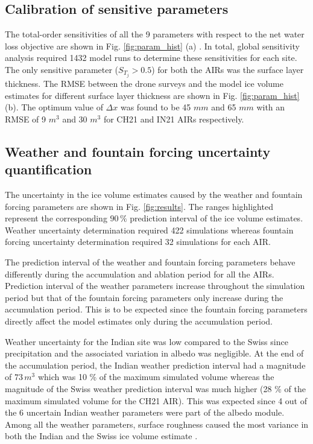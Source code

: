 \documentclass[utf8]{frontiersSCNS}
\begin{document}
\subsection{Calibration of sensitive parameters}

The total-order sensitivities of all the 9 parameters with respect to the net water loss objective are shown in
Fig. \ref{fig:param_hist} (a) . In total, global sensitivity analysis required 1432 model runs to determine these
sensitivities for each site. The only sensitive parameter ($S_{T_{j}} > 0.5$) for both the AIRs was the surface
layer thickness. The RMSE between the drone surveys and the model ice volume estimates for different surface
layer thickness are shown in Fig. \ref{fig:param_hist} (b). The optimum value of $\Delta x$ was found to be 45
$mm$ and 65 $mm$ with an RMSE of 9 $m^3$ and 30 $m^3$ for CH21 and IN21 AIRs respectively.


\subsection{Weather and fountain forcing uncertainty quantification}

The uncertainty in the ice volume estimates caused by the weather and fountain forcing parameters are shown in
Fig. \ref{fig:results}. The ranges highlighted represent the corresponding $90\,\%$ prediction interval of the
ice volume estimates. Weather uncertainty determination required 422 simulations whereas fountain forcing
uncertainty determination required 32 simulations for each AIR. 

The prediction interval of the weather and fountain forcing parameters behave differently during the
accumulation and ablation period for all the AIRs. Prediction interval of the weather parameters increase
throughout the simulation period but that of the fountain forcing parameters only increase during the
accumulation period. This is to be expected since the fountain forcing parameters directly affect the model
estimates only during the accumulation period. 

Weather uncertainty for the Indian site was low compared to the Swiss since precipitation and the associated
variation in albedo was negligible. At the end of the accumulation period, the Indian weather prediction
interval had a magnitude of  $73\,m^3$ which was 10 \% of the maximum simulated volume whereas the magnitude of
the Swiss weather prediction interval was much higher (28 \% of the maximum simulated volume for the CH21 AIR).
This was expected since 4 out of the 6 uncertain Indian weather parameters were part of the albedo module. Among
all the weather parameters, surface roughness caused the most variance in both the Indian and the Swiss ice
volume estimate .
\end{document}
